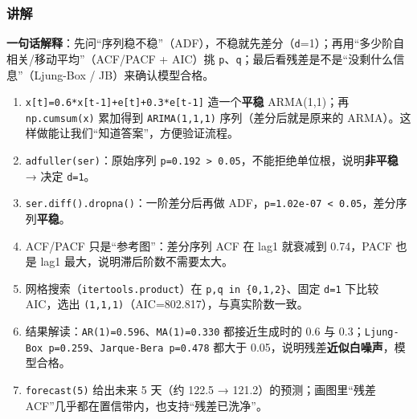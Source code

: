 \begin{Shaded}
\begin{Highlighting}[]
\end{Highlighting}
\end{Shaded}

\subsubsection{讲解}\label{ux8bb2ux89e3-28}

\textbf{一句话解释}：先问``序列稳不稳''（ADF），不稳就先差分（\texttt{d}=1）；再用``多少阶自相关/移动平均''（ACF/PACF
+ AIC）挑
\texttt{p}、\texttt{q}；最后看残差是不是``没剩什么信息''（Ljung-Box /
JB）来确认模型合格。

\begin{enumerate}
\def\labelenumi{\arabic{enumi}.}
\tightlist
\item
  \texttt{x{[}t{]}=0.6*x{[}t-1{]}+e{[}t{]}+0.3*e{[}t-1{]}}
  造一个\textbf{平稳} ARMA(1,1)；再 \texttt{np.cumsum(x)} 累加得到
  \texttt{ARIMA(1,1,1)} 序列（差分后就是原来的
  ARMA）。这样做能让我们``知道答案''，方便验证流程。
\item
  \texttt{adfuller(ser)}：原始序列
  \texttt{p=0.192\ \textgreater{}\ 0.05}，不能拒绝单位根，说明\textbf{非平稳}
  → 决定 \texttt{d=1}。
\item
  \texttt{ser.diff().dropna()}：一阶差分后再做
  ADF，\texttt{p=1.02e-07\ \textless{}\ 0.05}，差分序列\textbf{平稳}。
\item
  ACF/PACF 只是``参考图''：差分序列 ACF 在 lag1 就衰减到 0.74，PACF 也是
  lag1 最大，说明滞后阶数不需要太大。
\item
  网格搜索（\texttt{itertools.product}）在
  \texttt{p,q\ in\ \{0,1,2\}}、固定 \texttt{d=1} 下比较 AIC，选出
  \texttt{(1,1,1)}（AIC=802.817），与真实阶数一致。
\item
  结果解读：\texttt{AR(1)=0.596}、\texttt{MA(1)=0.330} 都接近生成时的
  0.6 与 0.3；\texttt{Ljung-Box\ p=0.259}、\texttt{Jarque-Bera\ p=0.478}
  都大于 0.05，说明残差\textbf{近似白噪声}，模型合格。
\item
  \texttt{forecast(5)} 给出未来 5 天（约 122.5 →
  121.2）的预测；画图里``残差
  ACF''几乎都在置信带内，也支持``残差已洗净''。
\end{enumerate}

